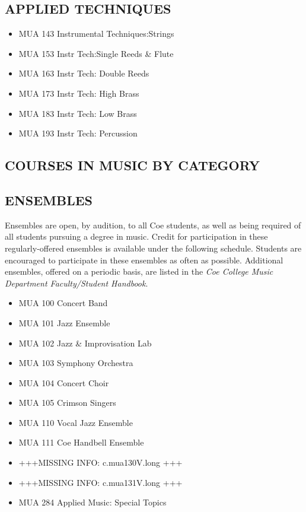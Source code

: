 \documentclass[
  letterpaper,
]{scrbook}
\providecommand{\tightlist}{%
  \setlength{\itemsep}{0pt}\setlength{\parskip}{0pt}}
\begin{document}
\subsection{APPLIED TECHNIQUES}\label{applied-techniques}

\begin{itemize}
\tightlist
\item
  MUA 143 Instrumental Techniques:Strings
\item
  MUA 153 Instr Tech:Single Reeds \& Flute
\item
  MUA 163 Instr Tech: Double Reeds
\item
  MUA 173 Instr Tech: High Brass
\item
  MUA 183 Instr Tech: Low Brass
\item
  MUA 193 Instr Tech: Percussion
\end{itemize}

\subsection{COURSES IN MUSIC BY
CATEGORY}\label{courses-in-music-by-category}

\subsection{ENSEMBLES}\label{ensembles}

Ensembles are open, by audition, to all Coe students, as well as being
required of all students pursuing a degree in music. Credit for
participation in these regularly-offered ensembles is available under
the following schedule. Students are encouraged to participate in these
ensembles as often as possible. Additional ensembles, offered on a
periodic basis, are listed in the \emph{Coe College Music Department
Faculty/Student Handbook}.

\begin{itemize}
\tightlist
\item
  MUA 100 Concert Band
\item
  MUA 101 Jazz Ensemble
\item
  MUA 102 Jazz \& Improvisation Lab
\item
  MUA 103 Symphony Orchestra
\item
  MUA 104 Concert Choir
\item
  MUA 105 Crimson Singers
\item
  MUA 110 Vocal Jazz Ensemble
\item
  MUA 111 Coe Handbell Ensemble
\item
  +++MISSING INFO: c.mua130V.long +++
\item
  +++MISSING INFO: c.mua131V.long +++
\item
  MUA 284 Applied Music: Special Topics
\end{itemize}
\end{document}
